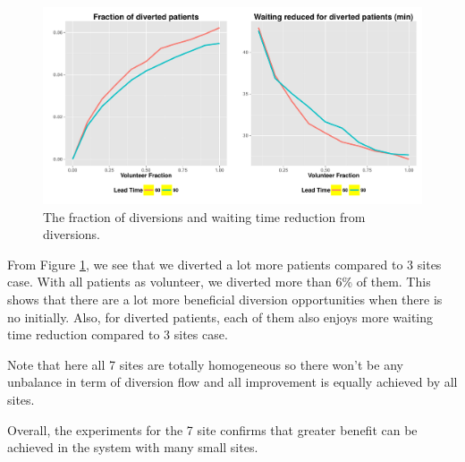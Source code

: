 \begin{figure}[htp]
\centering
\includegraphics[width=.9\textwidth]{chap3/numeric/pic/7sites_diversion_gain}
\caption{The fraction of diversions and waiting time reduction from diversions.}
\label{fig:7sites_diversion_gain}
\end{figure}

From Figure \ref{fig:7sites_diversion_gain}, we see that we diverted a lot
more patients compared to 3 sites case. With all patients as volunteer, we
diverted more than 6\% of them. This shows that there are a lot more
beneficial diversion opportunities when there is no initially. Also, for
diverted patients, each of them also enjoys more waiting time reduction
compared to 3 sites case.

Note that here all 7 sites are totally homogeneous so there won't be any
unbalance in term of diversion flow and all improvement is equally achieved
by all sites.

Overall, the experiments for the 7 site confirms that greater benefit can
be achieved in the system with many small sites.

